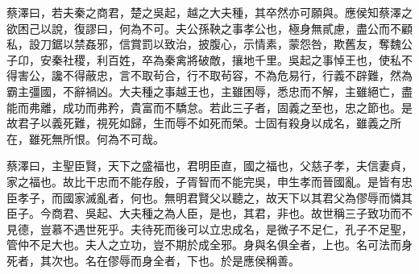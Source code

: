 蔡澤曰，若夫秦之商君，楚之吳起，越之大夫種，其卒然亦可願與。應侯知蔡澤之欲困己以說，復謬曰，何為不可。夫公孫鞅之事孝公也，極身無貳慮，盡公而不顧私，設刀鋸以禁姦邪，信賞罰以致治，披腹心，示情素，蒙怨咎，欺舊友，奪魏公子卬，安秦社稷，利百姓，卒為秦禽將破敵，攘地千里。吳起之事悼王也，使私不得害公，讒不得蔽忠，言不取茍合，行不取茍容，不為危易行，行義不辟難，然為霸主彊國，不辭禍凶。大夫種之事越王也，主雖困辱，悉忠而不解，主雖絕亡，盡能而弗離，成功而弗矜，貴富而不驕怠。若此三子者，固義之至也，忠之節也。是故君子以義死難，視死如歸，生而辱不如死而榮。士固有殺身以成名，雖義之所在，雖死無所恨。何為不可哉。

蔡澤曰，主聖臣賢，天下之盛福也，君明臣直，國之福也，父慈子孝，夫信妻貞，家之福也。故比干忠而不能存殷，子胥智而不能完吳，申生孝而晉國亂。是皆有忠臣孝子，而國家滅亂者，何也。無明君賢父以聽之，故天下以其君父為僇辱而憐其臣子。今商君、吳起、大夫種之為人臣，是也，其君，非也。故世稱三子致功而不見德，豈慕不遇世死乎。夫待死而後可以立忠成名，是微子不足仁，孔子不足聖，管仲不足大也。夫人之立功，豈不期於成全邪。身與名俱全者，上也。名可法而身死者，其次也。名在僇辱而身全者，下也。於是應侯稱善。

